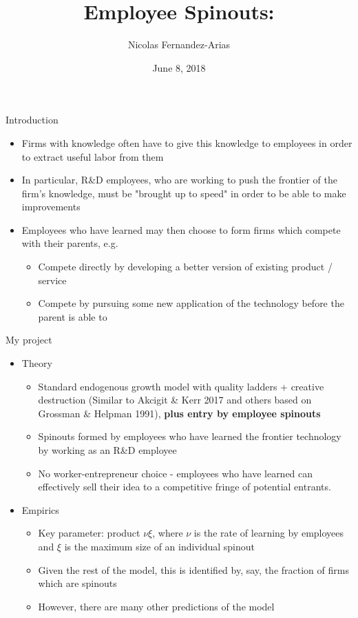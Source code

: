 \documentclass[english,usenames,dvipsnames]{beamer}
\title{Employee Spinouts: }
\author{Nicolas Fernandez-Arias}
\date[June 8, 2018]{June 8, 2018}
\begin{document}
	
\maketitle	
		
\begin{frame}{Introduction}
\begin{itemize}
	\item Firms with knowledge often have to give this knowledge to employees in order to extract useful labor from them
	\item In particular, R\&D employees, who are working to push the frontier of the firm's knowledge, must be "brought up to speed" in order to be able to make improvements
	\item Employees who have learned may then choose to form firms which compete with their parents, e.g. 
	\begin{itemize}
		\item Compete directly by developing a better version of existing product / service
		\item Compete by pursuing some new application of the technology before the parent is able to 
	\end{itemize}
\end{itemize}
\end{frame}

\begin{frame}{My project}
\begin{itemize}
	\item Theory
	\begin{itemize}
		\item Standard endogenous growth model with quality ladders + creative destruction (Similar to Akcigit \& Kerr 2017 and others based on Grossman \& Helpman 1991), \textbf{plus entry by employee spinouts} 
		\item Spinouts formed by employees who have learned the frontier technology by working as an R\&D employee 
		\item No worker-entrepreneur choice - employees who have learned can effectively sell their idea to a competitive fringe of potential entrants. 
	\end{itemize}
	\item Empirics
	\begin{itemize}
		\item Key parameter: product $\nu \xi$, where $\nu$ is the rate of learning by employees and $\xi$ is the maximum size of an individual spinout
		\item Given the rest of the model, this is identified by, say, the fraction of firms which are spinouts 
		\item However, there are many other predictions of the model 
	\end{itemize}
\end{itemize}
\end{frame}




	
	
	
	
	
	
	
	
\end{document}
